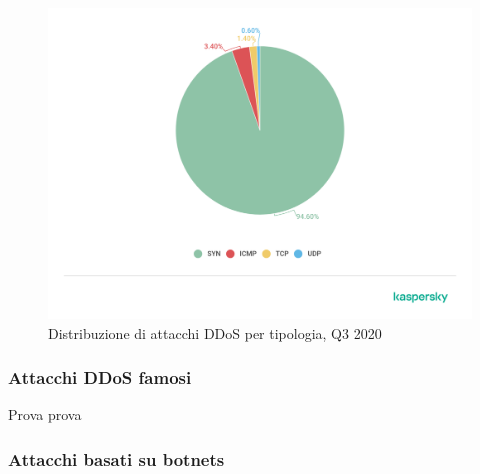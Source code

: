 \begin{figure}[h]
    \includegraphics[width=\hsize]{images/introduzione/07-en-ddos-report-q3-2020-chrarts.png}
    \caption{Distribuzione di attacchi DDoS per tipologia, Q3 2020 \cite{ddos_kaspersky_q3_2020}}
    \centering
\end{figure}

\subsubsection{Attacchi DDoS famosi}


Prova prova



\subsubsection{Attacchi basati su botnets}

